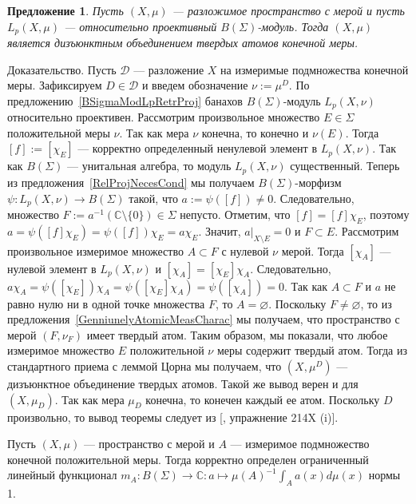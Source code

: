 \documentclass[12pt]{article}
\numberwithin{equation}{subsection}
\theoremstyle{plain}
\newtheorem{proposition}{Предложение}
\newenvironment{proof}{Доказательство.}{}
\begin{document}
\begin{fulltext}
    \begin{proposition}\label{LpBSigmaModNecessCond} Пусть $(X,\mu)$ ---
        разложимое пространство с мерой и пусть $L_p(X,\mu)$ --- относительно
        проективный $B(\Sigma)$-модуль. Тогда $(X,\mu)$ является дизъюнктным
        объединением твердых атомов конечной меры.
    \end{proposition}
    \begin{proof} Пусть $\mathcal{D}$ --- разложение $X$ на измеримые
        подмножества конечной меры. Зафиксируем $D\in\mathcal{D}$ и введем
        обозначение $\nu:=\mu^D$. По предложению~\ref{BSigmaModLpRetrProj}
        банахов $B(\Sigma)$-модуль $L_p(X,\nu)$ относительно проективен.
        Рассмотрим произвольное множество $E\in\Sigma$ положительной меры $\nu$.
        Так как мера $\nu$ конечна, то конечно и $\nu(E)$. Тогда $[f]:=[\chi_E]$
        --- корректно определенный ненулевой элемент в $L_p(X,\nu)$. Так как
        $B(\Sigma)$ --- унитальная алгебра, то модуль $L_p(X,\nu)$ существенный.
        Теперь из предложения~\ref{RelProjNecesCond} мы получаем
        $B(\Sigma)$-морфизм $\psi:L_p(X,\nu)\to B(\Sigma)$ такой, что
        $a:=\psi([f])\neq 0$. Следовательно, множество
        $F:=a^{-1}(\mathbb{C}\setminus \{0\})\in\Sigma$ непусто. Отметим, что
        $[f]=[f]\chi_E$, поэтому $a=\psi([f]\chi_E)=\psi([f])\chi_E=a\chi_E$.
        Значит, $a|_{X\setminus E}=0$ и $F\subset E$. Рассмотрим произвольное
        измеримое множество $A\subset F$ с нулевой $\nu$ мерой. Тогда $[\chi_A]$
        --- нулевой элемент в  $L_p(X,\nu)$ и $[\chi_A]=[\chi_E]\chi_A$.
        Следовательно,
        $a\chi_A=\psi([\chi_E])\chi_A=\psi([\chi_E]\chi_A)=\psi([\chi_A])=0$.
        Так как $A\subset F$ и $a$ не равно нулю ни в одной точке множества $F$,
        то $A=\varnothing$. Поскольку $F\neq \varnothing$, то из
        предложения~\ref{GenniunelyAtomicMeasCharac} мы получаем, что
        пространство с мерой $(F,\nu_F)$ имеет твердый атом. Таким образом, мы
        показали, что любое измеримое множество $E$ положительной $\nu$ меры
        содержит твердый атом. Тогда из стандартного приема с леммой Цорна мы
        получаем, что $(X,\mu^D)$ --- дизъюнктное объединение твердых атомов.
        Такой же вывод верен и для $(X,\mu_D)$. Так как мера $\mu_D$ конечна, то
        конечен каждый ее атом. Поскольку $D$ произвольно, то вывод теоремы
        следует из [\cite{FremMeasTh2}, упражнение 214X (i)].
    \end{proof}

    Пусть $(X,\mu)$ --- пространство с мерой и $A$ --- измеримое подмножество
    конечной положительной меры. Тогда корректно определен ограниченный линейный
    функционал $m_A:B(\Sigma)\to\mathbb{C}:a\mapsto {\mu(A)}^{-1}\int_A
        a(x)d\mu(x)$ нормы 1.


\end{fulltext}
\end{document}

